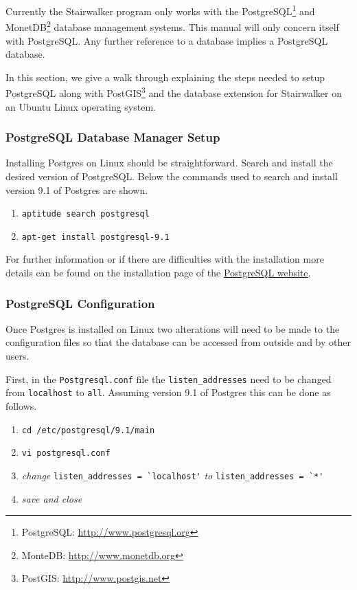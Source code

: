Currently the Stairwalker program only works with the
PostgreSQL\footnote{PostgreSQL: \url{http://www.postgresql.org}} and
MonetDB\footnote{MonteDB: \url{http://www.monetdb.org}} database management
systems. This manual will only concern itself with PostgreSQL. Any further
reference to a database implies a PostgreSQL database.

In this section, we give a walk through explaining the steps needed to
setup PostgreSQL along with PostGIS\footnote{PostGIS:
\url{http://www.postgis.net}} and the database extension for
Stairwalker on an Ubuntu Linux operating system.

\subsubsection{PostgreSQL Database Manager Setup}
\label{sec:postgresql}

Installing Postgres on Linux should be straightforward. Search and install
the desired version of PostgreSQL. Below the commands used to search and
install version 9.1 of Postgres are shown.

\begin{enumerate}[noitemsep]
	\item \lstinline|aptitude search postgresql|
	\item \lstinline|apt-get install postgresql-9.1|
\end{enumerate}

For further information or if there are difficulties with the installation
more details can be found on the installation page of the
\href{http://www.postgresql.org/download/}{PostgreSQL website}.  

\subsubsection{PostgreSQL Configuration}

Once Postgres is installed on Linux two alterations will need to be made to
the configuration files so that the database can be accessed from outside
and by other users.

First, in the \lstinline|Postgresql.conf| file the
\lstinline|listen_addresses| need to be changed from \lstinline|localhost|
to \lstinline|all|. Assuming version 9.1 of Postgres this can be done as
follows.

\begin{enumerate}[noitemsep]
	\item \lstinline|cd /etc/postgresql/9.1/main|
	\item \lstinline|vi postgresql.conf|
	\item \textit{change} \lstinline|listen_addresses = `localhost'| \textit{to} \lstinline|listen_addresses = `*'|
	\item \textit{save and close}
\end{enumerate}

